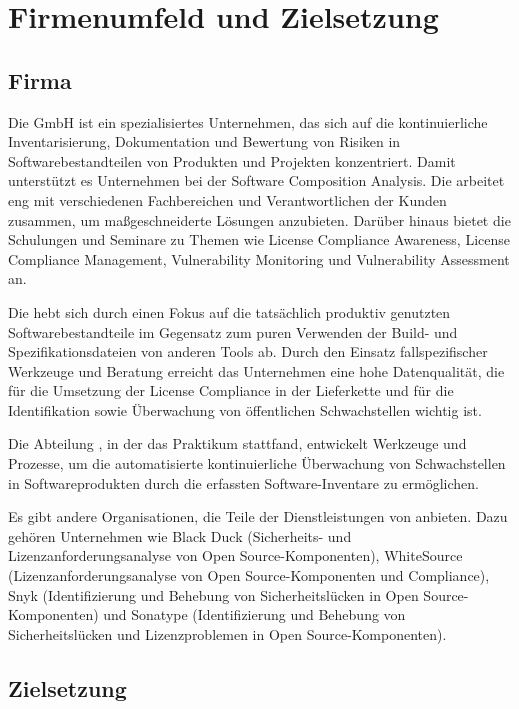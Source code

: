

\chapter{Firmenumfeld und Zielsetzung} \label{ch:firmenumfeld-zielsetzung}


\section{Firma} \label{sec:firma-beschreibung}

Die {\metaeffekt} GmbH ist ein spezialisiertes Unternehmen, das sich auf die kontinuierliche Inventarisierung, Dokumentation und Bewertung von Risiken in Softwarebestandteilen von Produkten und Projekten konzentriert.
Damit unterstützt es Unternehmen bei der Software Composition Analysis.
Die {\metaeffekt} arbeitet eng mit verschiedenen Fachbereichen und Verantwortlichen der Kunden zusammen, um maßgeschneiderte Lösungen anzubieten.
Darüber hinaus bietet die {\metaeffekt} Schulungen und Seminare zu Themen wie License Compliance Awareness, License Compliance Management, Vulnerability Monitoring und Vulnerability Assessment an.

Die {\metaeffekt} hebt sich durch einen Fokus auf die tatsächlich produktiv genutzten Softwarebestandteile im Gegensatz zum puren Verwenden der Build- und Spezifikationsdateien von anderen Tools ab.
Durch den Einsatz fallspezifischer Werkzeuge und Beratung erreicht das Unternehmen eine hohe Datenqualität, die für die Umsetzung der License Compliance in der Lieferkette und für die Identifikation sowie Überwachung von öffentlichen Schwachstellen wichtig ist.

Die Abteilung , in der das Praktikum stattfand, entwickelt Werkzeuge und Prozesse, um die automatisierte kontinuierliche Überwachung von Schwachstellen in Softwareprodukten durch die erfassten Software-Inventare zu ermöglichen.

Es gibt andere Organisationen, die Teile der Dienstleistungen von {\metaeffekt} anbieten.
Dazu gehören Unternehmen wie
Black Duck (Sicherheits- und Lizenzanforderungsanalyse von Open Source-Komponenten),
WhiteSource (Lizenzanforderungsanalyse von Open Source-Komponenten und Compliance),
Snyk (Identifizierung und Behebung von Sicherheitslücken in Open Source-Komponenten) und
Sonatype (Identifizierung und Behebung von Sicherheitslücken und Lizenzproblemen in Open Source-Komponenten).


\section{Zielsetzung} \label{sec:zielsetzung-des-praktikums}

